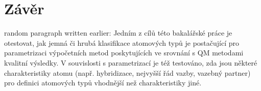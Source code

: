 \chapter{Závěr}
random paragraph written earlier: 
Jedním z cílů této bakalářské práce je otestovat, jak jemná či hrubá klasifikace atomových typů je postačující pro parametrizaci výpočetních metod poskytujících ve srovnání s QM metodami kvalitní výsledky. V souvislosti s parametrizací je též testováno, zda jsou některé charakteristiky atomu (např. hybridizace, nejvyšší řád vazby, vazebný partner) pro definici atomových typů vhodnější než charakteristiky jiné. 
